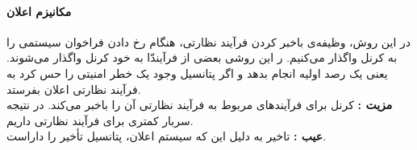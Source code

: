 \documentclass[]{article}
\begin{document}
\begin{enumerate}[(A)]
\begin{enumerate}[i.]
                        \paragraph*{مکانیزم اعلان }
                        در این روش، وظیفه‌ی باخبر کردن فرآیند نظارتی، هنگام رخ دادن فراخوان سیستمی را به کرنل واگذار می‌کنیم.
                        ر این روشی بعضی از فرآیند‌ّا به خود کرنل واگذار می‌شوند.
                        یعنی یک رصد اولیه انجام بدهد و اگر پتانسیل وجود یک خطر امنیتی را حس کرد به فرآیند نظارتی اعلان بفرستد.
                        \\
                        \textbf{مزیت : } کرنل برای فرآیند‌های مربوط به فرآیند نظارتی آن را باخبر می‌کند. در نتیجه سربار کمتری برای فرآیند نظارتی داریم.
                        \\
                        \textbf{عیب : }  تاخیر به دلیل این که سیستم اعلان، پتانسیل تأخیر را داراست.
                        \vspace{-0.25cm}

\end{enumerate}
\end{enumerate}
\end{document}
